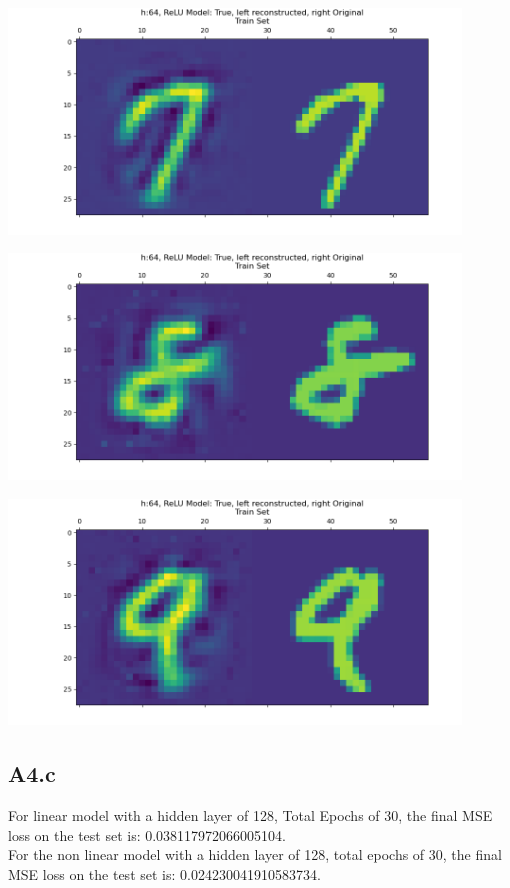\documentclass[]{article}
\begin{document}
        \begin{center}
            \includegraphics*[width=12cm]{A4plots/06-53-53-h-64-nonlin-digit-7.png}
        \end{center}
        \begin{center}
            \includegraphics*[width=12cm]{A4plots/06-53-53-h-64-nonlin-digit-8.png}
        \end{center}
        \begin{center}
            \includegraphics*[width=12cm]{A4plots/06-53-53-h-64-nonlin-digit-9.png}
        \end{center}
        
    \subsection*{A4.c}
        For linear model with a hidden layer of 128, Total Epochs of 30, the final  MSE loss on the test set is: 0.038117972066005104. 
        \\[1.1em]
        For the non linear model with a hidden layer of 128, total epochs of 30, the final MSE loss on the test set is: 0.024230041910583734. 
\end{document}
